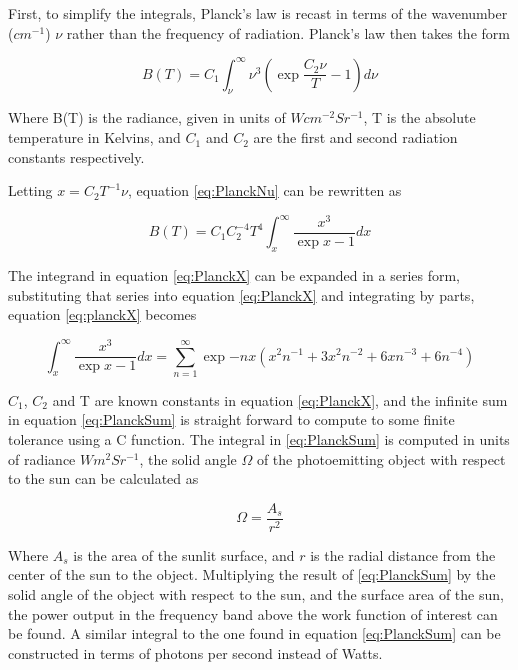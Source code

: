 First, to simplify the integrals, Planck's law is recast in terms of the wavenumber ($cm^{-1}$) $\nu$ rather than the frequency of radiation. Planck's law then takes the form

\begin{equation}\label{eq:PlanckNu}
    B(T) = C_1 \int^{\infty}_{\nu} \nu^3 \left(\exp{\frac{C_2 \nu}{T}} - 1 \right) d \nu
\end{equation}

Where B(T) is the radiance, given in units of $W cm^{-2} Sr^{-1}$, T is the absolute temperature in Kelvins, and $C_1$ and $C_2$ are the first and second radiation constants respectively.

Letting $x = C_2 T^{-1} \nu$, equation \eqref{eq:PlanckNu} can be rewritten as 

\begin{equation}\label{eq:PlanckX}
    B(T) = C_1 C_2^{-4} T^4 \int^{\infty}_x \frac{x^3}{\exp{x} - 1} dx
\end{equation}

The integrand in equation \eqref{eq:PlanckX} can be expanded in a series form, substituting that series into equation \eqref{eq:PlanckX} and integrating by parts, equation \eqref{eq:planckX} becomes

\begin{equation}\label{eq:PlanckSum}
    \int^{\infty}_x \frac{x^3}{\exp{x} - 1} dx = \sum^{\infty}_{n=1} \exp{-n x} \left(x^2 n^{-1} + 3 x^2 n^{-2} + 6 x n^{-3} + 6 n^{-4} \right)
\end{equation}

$C_1$, $C_2$ and T are known constants in equation \eqref{eq:PlanckX}, and the infinite sum in equation \eqref{eq:PlanckSum} is straight forward to compute to some finite tolerance using a C function. The integral in \eqref{eq:PlanckSum} is computed in units of radiance $W m^2 Sr^{-1}$, the solid angle $\Omega$ of the photoemitting object with respect to the sun can be calculated as

\begin{equation*}
    \Omega = \frac{A_s}{r^2}
\end{equation*}

Where $A_s$ is the area of the sunlit surface, and $r$ is the radial distance from the center of the sun to the object. Multiplying the result of \eqref{eq:PlanckSum} by the solid angle of the object with respect to the sun, and the surface area of the sun, the power output in the frequency band above the work function of interest can be found. A similar integral to the one found in equation \eqref{eq:PlanckSum} can be constructed in terms of photons per second instead of Watts.

